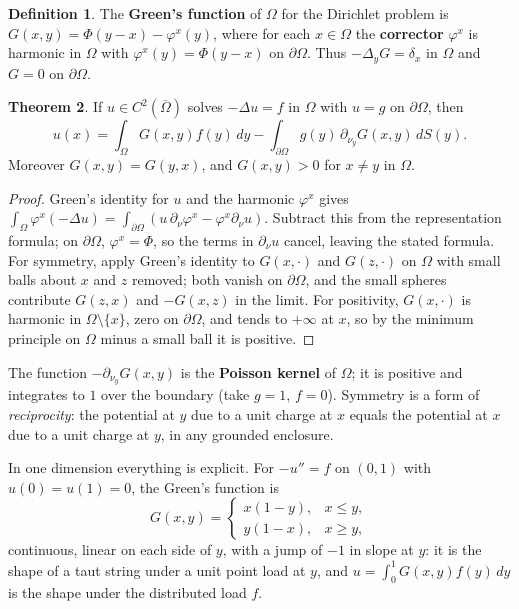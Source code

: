 \documentclass[11pt,a4paper]{article}
\numberwithin{equation}{section}
\theoremstyle{definition}
\newtheorem{thm}{Theorem}[subsection]
\newtheorem{defn}[thm]{Definition}
\begin{document}
\begin{defn}
The \textbf{Green's function} of $\Omega$ for the Dirichlet problem is $G(x, y) = \Phi(y - x) - \varphi^x(y)$, where for each $x \in \Omega$ the \textbf{corrector} $\varphi^x$ is harmonic in $\Omega$ with $\varphi^x(y) = \Phi(y - x)$ on $\partial\Omega$. Thus $-\Delta_yG = \delta_x$ in $\Omega$ and $G = 0$ on $\partial\Omega$.
\end{defn}

\begin{thm}
\label{thm:greensol}
If $u \in C^2(\overline\Omega)$ solves $-\Delta u = f$ in $\Omega$ with $u = g$ on $\partial\Omega$, then
\[
u(x) = \int_\Omega G(x, y)f(y)\,dy - \int_{\partial\Omega}g(y)\,\partial_{\nu_y}G(x, y)\,dS(y) .
\]
Moreover $G(x, y) = G(y, x)$, and $G(x, y) > 0$ for $x \neq y$ in $\Omega$.
\end{thm}

\begin{proof}
Green's identity for $u$ and the harmonic $\varphi^x$ gives $\int_\Omega\varphi^x(-\Delta u) = \int_{\partial\Omega}(u\,\partial_\nu\varphi^x - \varphi^x\partial_\nu u)$. Subtract this from the representation formula; on $\partial\Omega$, $\varphi^x = \Phi$, so the terms in $\partial_\nu u$ cancel, leaving the stated formula. For symmetry, apply
Green's identity to $G(x, \cdot)$ and $G(z, \cdot)$ on $\Omega$ with small balls about $x$ and $z$ removed; both vanish on $\partial\Omega$, and the small spheres contribute $G(z, x)$ and $-G(x, z)$ in the limit. For positivity, $G(x, \cdot)$ is harmonic in $\Omega \setminus \{x\}$, zero on $\partial\Omega$, and tends to
$+\infty$ at $x$, so by the minimum principle on $\Omega$ minus a small ball it is positive.
\end{proof}

The function $-\partial_{\nu_y}G(x, y)$ is the \textbf{Poisson kernel} of $\Omega$; it is positive and integrates to $1$ over the boundary (take $g = 1$, $f = 0$). Symmetry is a form of \emph{reciprocity}: the potential at $y$ due to a unit charge at $x$ equals the potential at $x$ due to a unit charge at $y$, in any
grounded enclosure.

In one dimension everything is explicit. For $-u'' = f$ on $(0, 1)$ with $u(0) = u(1) = 0$, the Green's function is
\[
G(x, y) = \begin{cases} x(1 - y), & x \leq y, \\ y(1 - x), & x \geq y , \end{cases}
\]
continuous, linear on each side of $y$, with a jump of $-1$ in slope at $y$: it is the shape of a taut string under a unit point load at $y$, and $u = \int_0^1G(x, y)f(y)\,dy$ is the shape under the distributed load $f$.
\end{document}
